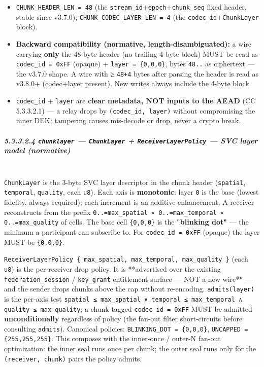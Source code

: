 \documentclass[11pt]{article}
\begin{document}
\begin{itemize}\setlength\itemsep{0pt}
\item \texttt{CHUNK\_HEADER\_LEN = 48} (the \texttt{stream\_id}+\texttt{epoch}+\texttt{chunk\_seq} fixed header, stable since v3.7.0); \texttt{CHUNK\_CODEC\_LAYER\_LEN = 4} (the \texttt{codec\_id}+\texttt{ChunkLayer} block).
\item \textbf{Backward compatibility (normative, length-disambiguated):} a wire carrying \textbf{only} the 48-byte header (no trailing 4-byte block) MUST be read as \texttt{codec\_id = 0xFF} (opaque) + \texttt{layer = \{0,0,0\}}, bytes \texttt{48..} as ciphertext — the v3.7.0 shape. A wire with ≥ \texttt{48+4} bytes after parsing the header is read as v3.8.0+ (codec+layer present). New writes always include the 4-byte block.
\item \texttt{codec\_id} + \texttt{layer} are \textbf{clear metadata, NOT inputs to the AEAD} (CC 5.3.3.2.1) — a relay drops by \texttt{(codec\_id, layer)} without compromising the inner DEK; tampering causes mis-decode or drop, never a crypto break.
\end{itemize}


\subparagraph{5.3.3.2.4 \texttt{chunklayer} — \texttt{ChunkLayer} + \texttt{ReceiverLayerPolicy} — SVC layer model (normative)}\mbox{}\\


\texttt{ChunkLayer} is the 3-byte SVC layer descriptor in the chunk header (\texttt{spatial}, \texttt{temporal}, \texttt{quality}, each \texttt{u8}). Each axis is \textbf{monotonic}: layer \texttt{0} is the base (lowest fidelity, always required); each increment is an additive enhancement. A receiver reconstructs from the prefix \texttt{0..=max\_spatial × 0..=max\_temporal × 0..=max\_quality} of cells. The base cell \texttt{\{0,0,0\}} is the \textbf{"blinking dot"} — the minimum a participant can subscribe to. For \texttt{codec\_id = 0xFF} (opaque) the layer MUST be \texttt{\{0,0,0\}}.


\texttt{ReceiverLayerPolicy \{ max\_spatial, max\_temporal, max\_quality \}} (each \texttt{u8}) is the per-receiver drop policy. It is **advertised over the existing \texttt{federation\_session} / \texttt{key\_grant} entitlement surface — NOT a new wire** — and the sender drops chunks above the cap without re-encoding. \texttt{admits(layer)} is the per-axis test \texttt{spatial ≤ max\_spatial ∧ temporal ≤ max\_temporal ∧ quality ≤ max\_quality}; a chunk tagged \texttt{codec\_id = 0xFF} MUST be admitted \textbf{unconditionally} regardless of policy (the fan-out filter short-circuits before consulting \texttt{admits}). Canonical policies: \texttt{BLINKING\_DOT = \{0,0,0\}}, \texttt{UNCAPPED = \{255,255,255\}}. This composes with the inner-once / outer-N fan-out optimization: the inner seal runs once per chunk; the outer seal runs only for the \texttt{(receiver, chunk)} pairs the policy admits.
\end{document}
